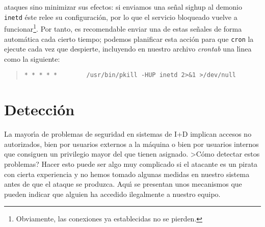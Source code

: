 \begin{itemize}
ataques sino minimizar sus efectos: si enviamos una se\~nal {\sc sighup} al
demonio {\tt inetd} \'este relee su configuraci\'on, por lo que el servicio
bloqueado vuelve a funcionar\footnote{Obviamente, las conexiones ya 
establecidas no se pierden.}. Por tanto, es recomendable enviar una de estas
se\~nales de forma autom\'atica cada cierto tiempo; podemos planificar esta
acci\'on para que {\tt cron} la ejecute cada vez que despierte, incluyendo en
nuestro archivo {\it crontab} una l\'{\i}nea como la siguiente:
\tt
\begin{quote}
\begin{verbatim}
* * * * *        /usr/bin/pkill -HUP inetd 2>&1 >/dev/null
\end{verbatim}
\end{quote}
\rm
\end{itemize}
\section{Detecci\'on}
La mayor\'{\i}a de problemas de seguridad en sistemas de I+D implican accesos
no autorizados, bien por usuarios externos a la m\'aquina o bien por usuarios
internos que consiguen un privilegio mayor del que tienen asignado.
>C\'omo detectar estos problemas? Hacer esto puede ser algo muy complicado si 
el atacante es un pirata con cierta experiencia y no hemos tomado algunas 
medidas en nuestro sistema antes de que el ataque se produzca. Aqu\'{\i} se 
presentan unos mecanismos que pueden indicar que alguien ha accedido 
ilegalmente a nuestro equipo.
